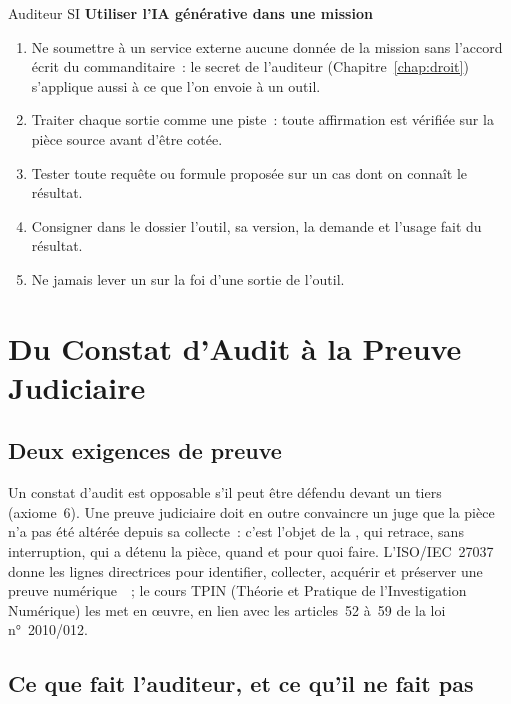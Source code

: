 \begin{boxmetier}{Auditeur SI}
\textbf{Utiliser l'IA générative dans une mission}
\begin{enumerate}
    \item Ne soumettre à un service externe aucune donnée de la mission
          sans l'accord écrit du commanditaire~: le secret de l'auditeur
          (Chapitre~\ref{chap:droit}) s'applique aussi à ce que l'on envoie
          à un outil.
    \item Traiter chaque sortie comme une piste~: toute affirmation est
          vérifiée sur la pièce source avant d'être cotée.
    \item Tester toute requête ou formule proposée sur un cas dont on
          connaît le résultat.
    \item Consigner dans le dossier l'outil, sa version, la demande et
          l'usage fait du résultat.
    \item Ne jamais lever un \NEK{} sur la foi d'une sortie de l'outil.
\end{enumerate}
\end{boxmetier}

\section{Du Constat d'Audit à la Preuve Judiciaire}
\label{sec:c20-preuve}

\subsection{Deux exigences de preuve}

Un constat d'audit est opposable s'il peut être défendu devant un tiers
(axiome~6). Une preuve judiciaire doit en outre convaincre un juge que la
pièce n'a pas été altérée depuis sa collecte~: c'est l'objet de la
, qui
retrace, sans interruption, qui a détenu la pièce, quand et pour quoi
faire. L'ISO/IEC~27037 donne les lignes directrices pour identifier,
collecter, acquérir et préserver une preuve numérique~\cite{iso27037_2012}~;
le cours TPIN (Théorie et Pratique de l'Investigation Numérique) les met en
œuvre, en lien avec les articles~52 à~59 de la loi n°~2010/012.

\subsection{Ce que fait l'auditeur, et ce qu'il ne fait pas}

